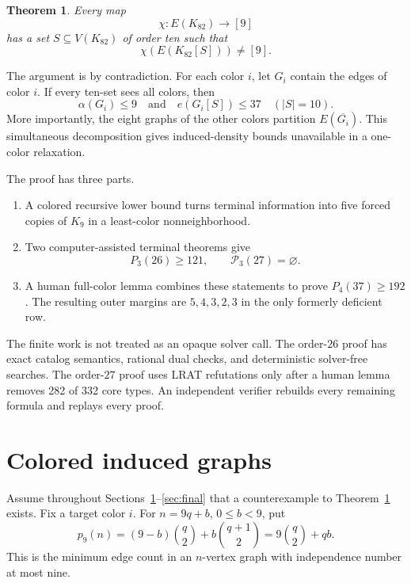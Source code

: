 \documentclass[11pt,reqno,a4paper]{amsart}
\newtheorem{theorem}{Theorem}[section]
\theoremstyle{definition}
\theoremstyle{remark}
\newcommand{\comp}[1]{\overline{#1}}
\newcommand{\cP}{\mathcal P}
\begin{document}
\begin{theorem}\label{thm:main}
Every map
\[
  \chi:E(K_{82})\longrightarrow[9]
\]
has a set $S\subseteq V(K_{82})$ of order ten such that
\[
  \chi(E(K_{82}[S]))\ne[9].
\]
\end{theorem}

The argument is by contradiction. For each color $i$, let $G_i$ contain
the edges of color $i$. If every ten-set sees all colors, then
\[
  \alpha(G_i)\le9
  \quad\text{and}\quad
  e(G_i[S])\le37\quad(|S|=10).
\]
More importantly, the eight graphs of the other colors partition
$E(\comp{G_i})$. This simultaneous decomposition gives induced-density
bounds unavailable in a one-color relaxation.

The proof has three parts.
\begin{enumerate}[label=\textup{(\roman*)},leftmargin=2.8em]
\item A colored recursive lower bound turns terminal information into
five forced copies of $K_9$ in a least-color nonneighborhood.
\item Two computer-assisted terminal theorems give
\[
  P_3(26)\ge121,\qquad \cP_3(27)=\varnothing.
\]
\item A human full-color lemma combines these statements to prove
$P_4(37)\ge192$. The resulting outer margins are
$5,4,3,2,3$ in the only formerly deficient row.
\end{enumerate}

The finite work is not treated as an opaque solver call. The order-$26$
proof has exact catalog semantics, rational dual checks, and deterministic
solver-free searches. The order-$27$ proof uses LRAT refutations only
after a human lemma removes 282 of 332 core types. An independent verifier
rebuilds every remaining formula and replays every proof.

\section{Colored induced graphs}\label{sec:colored}

Assume throughout Sections~\ref{sec:colored}--\ref{sec:final} that a
counterexample to Theorem~\ref{thm:main} exists. Fix a target color $i$.
For $n=9q+b$, $0\le b<9$, put
\begin{equation}\label{eq:p9}
 p_9(n)=(9-b)\binom q2+b\binom{q+1}{2}
       =9\binom q2+qb.
\end{equation}
This is the minimum edge count in an $n$-vertex graph with independence
number at most nine.
\end{document}
